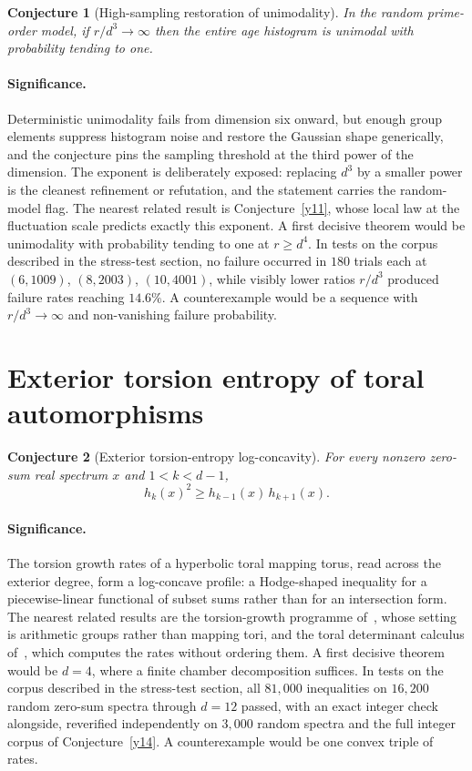 \documentclass[11pt]{article}
\newtheorem{conjecture}{Conjecture}
\theoremstyle{definition}
\begin{document}
\begin{conjecture}[High-sampling restoration of unimodality]\label{y12}
In the random prime-order model, if $r/d^3\to\infty$ then the entire age histogram is unimodal with probability tending to one.
\end{conjecture}

\paragraph{Significance.}
Deterministic unimodality fails from dimension six onward, but enough group elements suppress histogram noise and restore the Gaussian shape generically, and the conjecture pins the sampling threshold at the third power of the dimension.  The exponent is deliberately exposed: replacing $d^3$ by a smaller power is the cleanest refinement or refutation, and the statement carries the random-model flag.  The nearest related result is Conjecture~\ref{y11}, whose local law at the fluctuation scale predicts exactly this exponent.  A first decisive theorem would be unimodality with probability tending to one at $r\ge d^{4}$.  In tests on the corpus described in the stress-test section, no failure occurred in $180$ trials each at $(6,1009)$, $(8,2003)$, $(10,4001)$, while visibly lower ratios $r/d^3$ produced failure rates reaching $14.6\%$.  A counterexample would be a sequence with $r/d^3\to\infty$ and non-vanishing failure probability.

\section{Exterior torsion entropy of toral automorphisms}

\begin{conjecture}[Exterior torsion-entropy log-concavity]\label{y13}
For every nonzero zero-sum real spectrum $x$ and $1<k<d-1$,
\[
h_k(x)^2\ge h_{k-1}(x)\,h_{k+1}(x).
\]
\end{conjecture}

\paragraph{Significance.}
The torsion growth rates of a hyperbolic toral mapping torus, read across the exterior degree, form a log-concave profile: a Hodge-shaped inequality for a piecewise-linear functional of subset sums rather than for an intersection form.  The nearest related results are the torsion-growth programme of~\cite{BV13}, whose setting is arithmetic groups rather than mapping tori, and the toral determinant calculus of~\cite{BLP10}, which computes the rates without ordering them.  A first decisive theorem would be $d=4$, where a finite chamber decomposition suffices.  In tests on the corpus described in the stress-test section, all $81{,}000$ inequalities on $16{,}200$ random zero-sum spectra through $d=12$ passed, with an exact integer check alongside, reverified independently on $3{,}000$ random spectra and the full integer corpus of Conjecture~\ref{y14}.  A counterexample would be one convex triple of rates.
\end{document}
